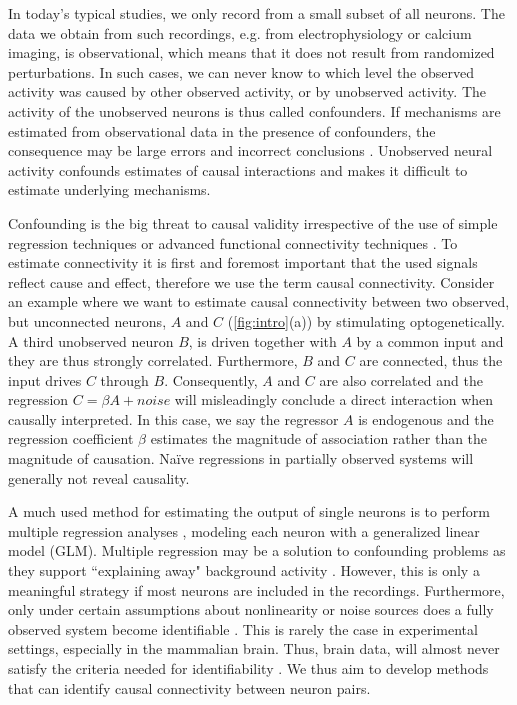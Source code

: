 \documentclass[11pt]{article}
\begin{document}
In today's typical studies, we only record from a small subset of all neurons. 
The data we obtain from such recordings, e.g. from electrophysiology or calcium imaging, is observational, which means that it does not result from randomized perturbations. 
In such cases, we can never know to which level the observed activity was caused by other observed activity, or by unobserved activity. 
The activity of the unobserved neurons is thus called confounders.
If mechanisms are estimated from observational data in the presence of confounders, the consequence may be large errors and incorrect conclusions \citep{angrist2008mostly}. 
Unobserved neural activity confounds estimates of causal interactions and makes it difficult to estimate underlying mechanisms.

Confounding is the big threat to causal validity \citep{pearl2009causality} irrespective of the use of simple regression techniques or advanced functional connectivity techniques \citep{stevenson2008inferring, honey2009predicting, aitchison2017or, pfau2013robust}.  
To estimate connectivity it is first and foremost important that the used signals reflect cause and effect, therefore we use the term causal connectivity. 
Consider an example where we want to estimate causal connectivity between two observed, but unconnected neurons, $ A $ and $ C $ (\cref{fig:intro}(a)) by stimulating optogenetically. 
A third unobserved neuron $ B $, is driven together with $ A $ by a common input and they are thus strongly correlated.
Furthermore, $ B $ and $ C $ are connected, thus the input drives $ C $ through $ B $.
Consequently, $ A $ and $ C $ are also correlated and the regression $ C = \beta A + noise$ will misleadingly conclude a direct interaction when causally interpreted. 
In this case, we say the regressor $ A $ is endogenous and the regression coefficient $ \beta $ estimates the magnitude of association rather than the magnitude of causation. 
Na\"ive regressions in partially observed systems will generally not reveal causality.

A much used method for estimating the output of single neurons is to perform multiple regression analyses \citep{pillow2008spatio}, modeling each neuron with a generalized linear model (GLM). 
Multiple regression may be a solution to confounding problems as they support ``explaining away" background activity \citep{stevenson2008inferring}.
However, this is only a meaningful strategy if most neurons are included in the recordings.
Furthermore, only under certain assumptions about nonlinearity or noise sources does a fully observed system become identifiable \citep{daniusis2012inferring,shimizu2006linear}.
This is rarely the case in experimental settings, especially in the mammalian brain.
Thus, brain data, will almost never satisfy the criteria needed for identifiability \citep{pearl2009causality}. 
We thus aim to develop methods that can identify causal connectivity between neuron pairs.
\end{document}
